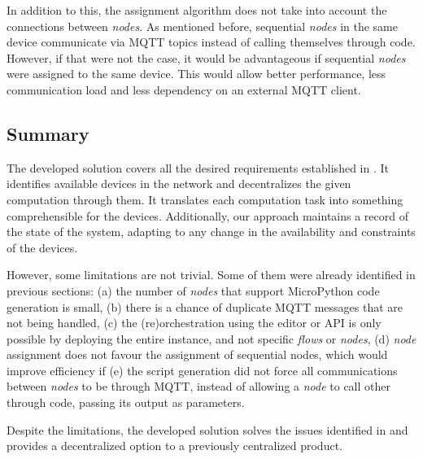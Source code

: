 In addition to this, the assignment algorithm does not take into account the connections between \textit{nodes}. As mentioned before, sequential \textit{nodes} in the same device communicate via MQTT topics instead of calling themselves through code. However, if that were not the case, it would be advantageous if sequential \textit{nodes} were assigned to the same device. This would allow better performance, less communication load and less dependency on an external MQTT client.

\subsection{Summary}\label{sec:solution_summary}

The developed solution covers all the desired requirements established in . It identifies available devices in the network and decentralizes the given computation through them. It translates each computation task into something comprehensible for the devices. Additionally, our approach maintains a record of the state of the system, adapting to any change in the availability and constraints of the devices.

However, some limitations are not trivial. Some of them were already identified in previous sections: (a) the number of \textit{nodes} that support MicroPython code generation is small, (b) there is a chance of duplicate MQTT messages that are not being handled, (c) the (re)orchestration using the editor or API is only possible by deploying the entire instance, and not specific \textit{flows} or \textit{nodes}, (d) \textit{node} assignment does not favour the assignment of sequential nodes, which would improve efficiency if (e) the script generation did not force all communications between \textit{nodes} to be through MQTT, instead of allowing a \textit{node} to call other through code, passing its output as parameters.

Despite the limitations, the developed solution solves the issues identified in  and provides a decentralized option to a previously centralized product.